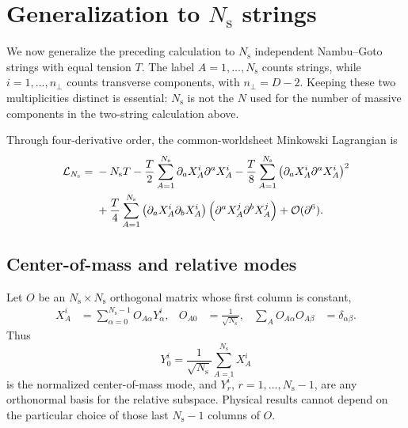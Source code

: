 \section{Generalization to \texorpdfstring{$N_{\mathrm s}$}{Ns} strings}
\label{sec:n-string-generalization}

We now generalize the preceding calculation to $N_{\mathrm s}$ independent
Nambu--Goto strings with equal tension $T$.  The label
$A=1,\ldots,N_{\mathrm s}$ counts strings, while
$i=1,\ldots,n_\perp$ counts transverse components,
with $n_\perp=D-2$.  Keeping these two multiplicities distinct is essential:
$N_{\mathrm s}$ is not the $N$ used for the number of massive components in
the two-string calculation above.

Through four-derivative order, the common-worldsheet Minkowski Lagrangian is
\begin{align}
  \mathcal L_{N_{\mathrm s}}
  ={}&-N_{\mathrm s}T
  -\frac{T}{2}\sum_{A=1}^{N_{\mathrm s}}
    \partial_aX_A^i\partial^aX_A^i
  -\frac{T}{8}\sum_{A=1}^{N_{\mathrm s}}
    \left(\partial_aX_A^i\partial^aX_A^i\right)^2
  \notag\\
  &+\frac{T}{4}\sum_{A=1}^{N_{\mathrm s}}
    \left(\partial_aX_A^i\partial_bX_A^i\right)
    \left(\partial^aX_A^j\partial^bX_A^j\right)
  +\mathcal O(\partial^6).
  \label{eq:n-string-ng-four-derivative}
\end{align}

\subsection{Center-of-mass and relative modes}

Let $O$ be an $N_{\mathrm s}\times N_{\mathrm s}$ orthogonal matrix whose
first column is constant,
\begin{align}
  X_A^i&=\sum_{\alpha=0}^{N_{\mathrm s}-1}O_{A\alpha}Y_\alpha^i,
  &O_{A0}&=\frac{1}{\sqrt{N_{\mathrm s}}},
  &\sum_AO_{A\alpha}O_{A\beta}&=\delta_{\alpha\beta}.
  \label{eq:n-string-orthogonal-transform}
\end{align}
Thus
\begin{equation}
  Y_0^i=\frac{1}{\sqrt{N_{\mathrm s}}}
        \sum_{A=1}^{N_{\mathrm s}}X_A^i
  \label{eq:n-string-normalized-center-mode}
\end{equation}
is the normalized center-of-mass mode, and
$Y_r^i$, $r=1,\ldots,N_{\mathrm s}-1$, are any orthonormal basis for the
relative subspace.  Physical results cannot depend on the particular choice
of those last $N_{\mathrm s}-1$ columns of $O$.

